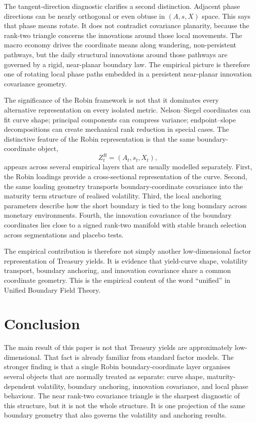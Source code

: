 \documentclass[11pt]{article}
\begin{document}
The tangent-direction diagnostic clarifies a second distinction. Adjacent phase directions can be nearly orthogonal or even obtuse in $(A,s,X)$ space. This says that phase means rotate. It does not contradict covariance planarity, because the rank-two triangle concerns the innovations around those local movements. The macro economy drives the coordinate means along wandering, non-persistent pathways, but the daily structural innovations around those pathways are governed by a rigid, near-planar boundary law. The empirical picture is therefore one of rotating local phase paths embedded in a persistent near-planar innovation covariance geometry.

The significance of the Robin framework is not that it dominates every alternative representation on every isolated metric. Nelson--Siegel coordinates can fit curve shape; principal components can compress variance; endpoint--slope decompositions can create mechanical rank reduction in special cases. The distinctive feature of the Robin representation is that the same boundary-coordinate object,
\[
    Z_t^R=(A_t,s_t,X_t),
\]
appears across several empirical layers that are usually modelled separately. First, the Robin loadings provide a cross-sectional representation of the curve. Second, the same loading geometry transports boundary-coordinate covariance into the maturity term structure of realised volatility. Third, the local anchoring parameters describe how the short boundary is tied to the long boundary across monetary environments. Fourth, the innovation covariance of the boundary coordinates lies close to a signed rank-two manifold with stable branch selection across segmentations and placebo tests.

The empirical contribution is therefore not simply another low-dimensional factor representation of Treasury yields. It is evidence that yield-curve shape, volatility transport, boundary anchoring, and innovation covariance share a common coordinate geometry. This is the empirical content of the word ``unified'' in Unified Boundary Field Theory.

\section{Conclusion}

The main result of this paper is not that Treasury yields are approximately low-dimensional. That fact is already familiar from standard factor models. The stronger finding is that a single Robin boundary-coordinate layer organises several objects that are normally treated as separate: curve shape, maturity-dependent volatility, boundary anchoring, innovation covariance, and local phase behaviour. The near rank-two covariance triangle is the sharpest diagnostic of this structure, but it is not the whole structure. It is one projection of the same boundary geometry that also governs the volatility and anchoring results.
\end{document}
